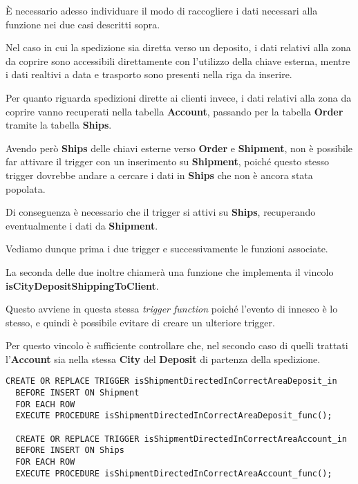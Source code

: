 È necessario adesso individuare il modo di raccogliere i dati necessari alla funzione nei due casi descritti sopra.

Nel caso in cui la spedizione sia diretta verso un deposito, i dati relativi alla zona da coprire sono accessibili direttamente con l'utilizzo della chiave esterna, mentre i dati realtivi a data e trasporto sono presenti nella riga da inserire.

Per quanto riguarda spedizioni dirette ai clienti invece, i dati relativi alla zona da coprire vanno recuperati nella tabella \textbf{Account}, passando per la tabella \textbf{Order} tramite la tabella \textbf{Ships}.

Avendo però \textbf{Ships} delle chiavi esterne verso \textbf{Order} e \textbf{Shipment}, non è possibile far attivare il trigger con un inserimento su \textbf{Shipment}, poiché questo stesso trigger dovrebbe andare a cercare i dati in \textbf{Ships} che non è ancora stata popolata.

Di conseguenza è necessario che il trigger si attivi su \textbf{Ships}, recuperando eventualmente i dati da \textbf{Shipment}.

Vediamo dunque prima i due trigger e successivamente le funzioni associate. 

La seconda delle due inoltre chiamerà una funzione che implementa il vincolo \textbf{isCityDepositShippingToClient}. 

Questo avviene in questa stessa \textit{trigger function} poiché l'evento di innesco è lo stesso, e quindi è possibile evitare di creare un ulteriore trigger.

Per questo vincolo è sufficiente controllare che, nel secondo caso di quelli trattati l'\textbf{Account} sia nella stessa \textbf{City} del \textbf{Deposit} di partenza della spedizione. 

\begin{lstlisting}[caption={Trigger per il vincolo \textbf{isShipmentDirectedInCorrectArea}}]
  CREATE OR REPLACE TRIGGER isShipmentDirectedInCorrectAreaDeposit_in
  BEFORE INSERT ON Shipment 
  FOR EACH ROW 
  EXECUTE PROCEDURE isShipmentDirectedInCorrectAreaDeposit_func();

  CREATE OR REPLACE TRIGGER isShipmentDirectedInCorrectAreaAccount_in
  BEFORE INSERT ON Ships
  FOR EACH ROW 
  EXECUTE PROCEDURE isShipmentDirectedInCorrectAreaAccount_func();
\end{lstlisting}

